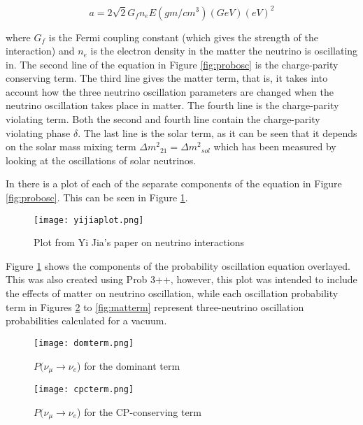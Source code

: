\documentclass[11pt,oneside,a4paper]{article}
\begin{document}
\begin{equation}
\label{eq:mattereffect}
a = 2\sqrt{2}G_fn_eE (gm/cm^3) (GeV) (eV)^2
\end{equation}

where $G_f$ is the Fermi coupling constant (which gives the strength of the interaction) and $n_e$ is the electron density in the matter the neutrino is oscillating in. The second line of the equation in Figure \ref{fig:probosc} is the charge-parity conserving term. The third line gives the matter term, that is, it takes into account how the three neutrino oscillation parameters are changed when the neutrino oscillation takes place in matter. The fourth line is the charge-parity violating term. Both the second and fourth line contain the charge-parity violating phase $\delta$. The last line is the solar term, as it can be seen that it depends on the solar mass mixing term $\Delta{m^2}_{21} = \Delta{m^2}_{sol}$ which has been measured by looking at the oscillations of solar neutrinos. 

In \cite{yijiapaper} there is a plot of each of the separate components of the equation in Figure \ref{fig:probosc}. This can be seen in Figure \ref{fig:jiaplot}.

	\begin{figure}
	\centering
	\captionsetup{justification=centering}
	\texttt{[image: yijiaplot.png]}
	\caption{Plot from Yi Jia's paper on neutrino interactions}
	\label{fig:jiaplot}
    \end{figure}


Figure \ref{fig:jiaplot} shows the components of the probability oscillation equation overlayed. This was also created using Prob 3++, however, this plot was intended to include the effects of matter on neutrino oscillation, while each oscillation probability term in Figures \ref{fig:domterm} to \ref{fig:matterm} represent three-neutrino oscillation probabilities calculated for a vacuum.

	\begin{figure}
	\centering
	\captionsetup{justification=centering}
	\texttt{[image: domterm.png]}
	\caption{$P(\nu_{\mu} \rightarrow \nu_{e}$) for the dominant term}
	\label{fig:domterm}
	\end{figure}

	\begin{figure}
	\centering
	\captionsetup{justification=centering}
	\texttt{[image: cpcterm.png]}
	\caption{$P(\nu_{\mu} \rightarrow \nu_{e}$) for the CP-conserving term}
	\label{fig:cpcterm}
	\end{figure}
\end{document}
